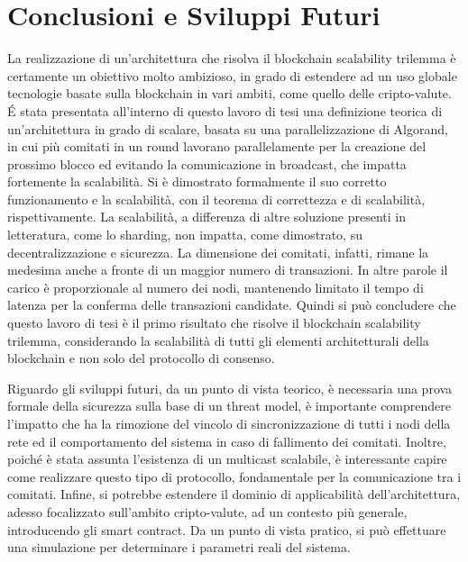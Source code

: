 \chapter{Conclusioni e Sviluppi Futuri}

La realizzazione di un'architettura che risolva il blockchain scalability trilemma è certamente un obiettivo molto ambizioso, in grado di estendere ad un uso globale tecnologie basate sulla blockchain in vari ambiti, come quello delle cripto-valute. \'E stata presentata all'interno di questo lavoro di tesi una definizione teorica di un'architettura in grado di scalare, basata su una parallelizzazione di Algorand, in cui più comitati in un round lavorano parallelamente per la creazione del prossimo blocco ed evitando la comunicazione in broadcast, che impatta fortemente la scalabilità. Si è dimostrato formalmente il suo corretto funzionamento e la scalabilità, con il teorema di correttezza e di scalabilità, rispettivamente. La scalabilità, a differenza di altre soluzione presenti in letteratura, come lo sharding, non impatta, come dimostrato, su decentralizzazione e sicurezza. La dimensione dei comitati, infatti, rimane la medesima anche a fronte di un maggior numero di transazioni. In altre parole il carico è proporzionale al numero dei nodi, mantenendo limitato il tempo di latenza per la conferma delle transazioni candidate. Quindi si può concludere che questo lavoro di tesi è il primo risultato che risolve il blockchain scalability trilemma, considerando la scalabilità di tutti gli elementi architetturali della blockchain e non solo del protocollo di consenso.

Riguardo gli sviluppi futuri, da un punto di vista teorico, è necessaria una prova formale della sicurezza sulla base di un threat model, è importante comprendere l'impatto che ha la rimozione del vincolo di sincronizzazione di tutti i nodi della rete ed il comportamento del sistema in caso di fallimento dei comitati. Inoltre, poiché è stata assunta l'esistenza di un multicast scalabile, è interessante capire come realizzare questo tipo di protocollo, fondamentale per la comunicazione tra i comitati. Infine, si potrebbe estendere il dominio di applicabilità dell'architettura, adesso focalizzato sull'ambito cripto-valute, ad un contesto più generale, introducendo gli smart contract. Da un punto di vista pratico, si può effettuare una simulazione per determinare i parametri reali del sistema.

